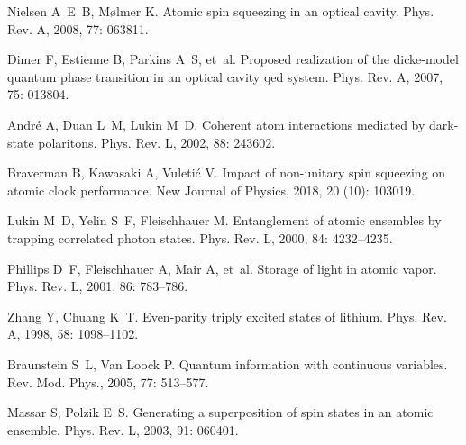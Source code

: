 \begin{thebibliography}{113}
	Nielsen A~E~B, M\o{}lmer K.
	\newblock Atomic spin squeezing in an optical cavity\allowbreak[J].
	\newblock Phys. Rev. A, 2008, 77: 063811.
	
	Dimer F, Estienne B, Parkins A~S, et~al.
	\newblock Proposed realization of the dicke-model quantum phase transition in
	an optical cavity qed system\allowbreak[J].
	\newblock Phys. Rev. A, 2007, 75: 013804.
	
	Andr\'e A, Duan L~M, Lukin M~D.
	\newblock Coherent atom interactions mediated by dark-state
	polaritons\allowbreak[J].
	\newblock Phys. Rev. L, 2002, 88: 243602.
	
	Braverman B, Kawasaki A, Vuleti{\'{c}} V.
	\newblock Impact of non-unitary spin squeezing on atomic clock
	performance\allowbreak[J].
	\newblock New Journal of Physics, 2018, 20 (10): 103019.
	
	Lukin M~D, Yelin S~F, Fleischhauer M.
	\newblock Entanglement of atomic ensembles by trapping correlated photon
	states\allowbreak[J].
	\newblock Phys. Rev. L, 2000, 84: 4232--4235.
	
	Phillips D~F, Fleischhauer A, Mair A, et~al.
	\newblock Storage of light in atomic vapor\allowbreak[J].
	\newblock Phys. Rev. L, 2001, 86: 783--786.
	
	Zhang Y, Chuang K~T.
	\newblock Even-parity triply excited states of lithium\allowbreak[J].
	\newblock Phys. Rev. A, 1998, 58: 1098--1102.
	
	Braunstein S~L, Van Loock P.
	\newblock Quantum information with continuous variables\allowbreak[J].
	\newblock Rev. Mod. Phys., 2005, 77: 513--577.
	
	Massar S, Polzik E~S.
	\newblock Generating a superposition of spin states in an atomic
	ensemble\allowbreak[J].
	\newblock Phys. Rev. L, 2003, 91: 060401.
	

\end{thebibliography}
